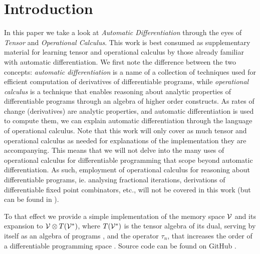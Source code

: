 \section{Introduction}\label{sec:introduction}

In this paper we take a look at \emph{Automatic Differentiation} through the eyes of \emph{Tensor} and \emph{Operational Calculus}. This work is best consumed as supplementary material for learning tensor and operational calculus by those already familiar with automatic differentiation. We first note the difference between the two concepts: \emph{automatic differentiation} is a name of a collection of techniques used for efficient computation of derivatives of differentiable programs, while \emph{operational calculus} is a technique that enables reasoning about analytic properties of differentiable programs through an algebra of higher order constructs. As rates of change (derivatives) are analytic properties, and automatic differentiation is used to compute them, we can explain automatic differentiation through the language of operational calculus. Note that this work will only cover as much tensor and operational calculus as needed for explanations of the implementation they are accompanying. This means that we will not delve into the many uses of operational calculus for differentiable programming that scope beyond automatic differentiation. As such, employment of operational calculus for reasoning about differentiable programs, ie. analysing fractional iterations, derivations of differentiable fixed point combinators, etc., will not be covered in this work (but can be found in \cite{OperationalCalculus}).

To that effect we provide a simple implementation of the memory space $\mathcal{V}$ and its expansion to $\mathcal{V}\otimes T(\mathcal{V}^*)$, where $T(\mathcal{V}^*)$ is the tensor algebra of its dual, serving by itself as an algebra of programs \cite[Definition~4.1]{OperationalCalculus}, and the operator $\tau_n$, that increases the order of a differentiable programming space \cite[Proposition~5.1]{OperationalCalculus}.
Source code can be found on GitHub \cite{dCpp}.


